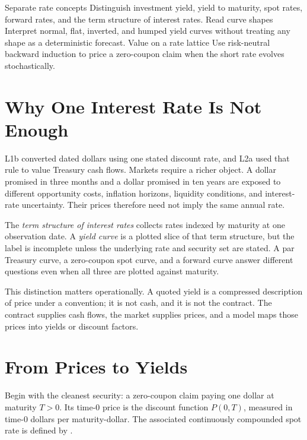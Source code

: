 \documentclass[11pt]{article}
\begin{document}

\learningobjectives
  {Separate rate concepts}
  {Distinguish investment yield, yield to maturity, spot rates, forward rates, and the term structure of interest rates.}
  {Read curve shapes}
  {Interpret normal, flat, inverted, and humped yield curves without treating any shape as a deterministic forecast.}
  {Value on a rate lattice}
  {Use risk-neutral backward induction to price a zero-coupon claim when the short rate evolves stochastically.}

\section{Why One Interest Rate Is Not Enough}

L1b converted dated dollars using one stated discount rate, and L2a used that rule to value Treasury cash flows. Markets require a richer object. A dollar promised in three months and a dollar promised in ten years are exposed to different opportunity costs, inflation horizons, liquidity conditions, and interest-rate uncertainty. Their prices therefore need not imply the same annual rate.

The \emph{term structure of interest rates} collects rates indexed by maturity at one observation date. A \emph{yield curve} is a plotted slice of that term structure, but the label is incomplete unless the underlying rate and security set are stated. A par Treasury curve, a zero-coupon spot curve, and a forward curve answer different questions even when all three are plotted against maturity.

This distinction matters operationally. A quoted yield is a compressed description of price under a convention; it is not cash, and it is not the contract. The contract supplies cash flows, the market supplies prices, and a model maps those prices into yields or discount factors.

\section{From Prices to Yields}

Begin with the cleanest security: a zero-coupon claim paying one dollar at maturity $T>0$. Its time-0 price is the discount function $P(0,T)$, measured in time-0 dollars per maturity-dollar. The associated continuously compounded spot rate is defined by .
\end{document}
